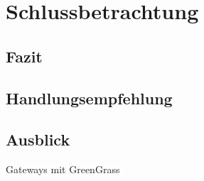 \chapter{Schlussbetrachtung}

\section{Fazit}

\section{Handlungsempfehlung}

\section{Ausblick}

Gateways mit GreenGrass